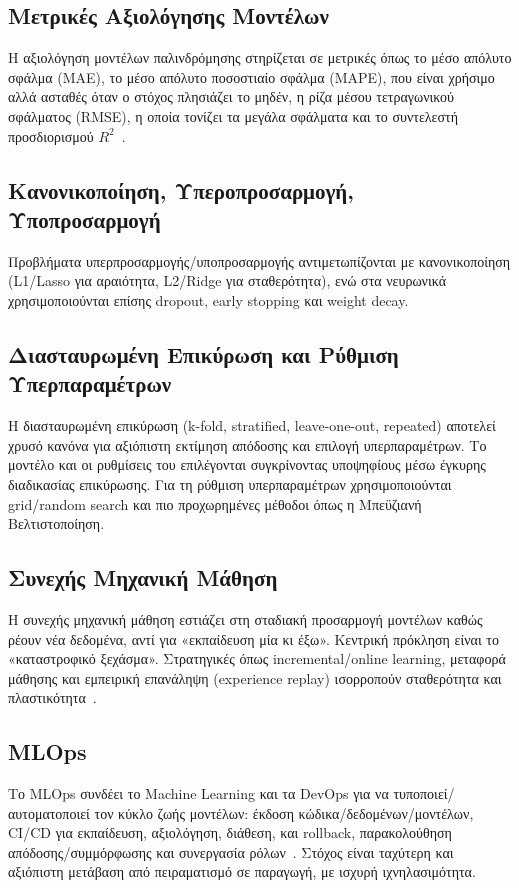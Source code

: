\subsection*{Μετρικές Αξιολόγησης Μοντέλων}
Η αξιολόγηση μοντέλων παλινδρόμησης στηρίζεται σε μετρικές όπως το μέσο απόλυτο σφάλμα (MAE), το μέσο απόλυτο ποσοστιαίο σφάλμα (MAPE), που είναι χρήσιμο αλλά ασταθές όταν ο στόχος πλησιάζει το μηδέν, η ρίζα μέσου τετραγωνικού σφάλματος (RMSE), η οποία τονίζει τα μεγάλα σφάλματα και το συντελεστή προσδιορισμού $R^2$~\cite{bishop2006pattern}.

\subsection*{Κανονικοποίηση, Υπεροπροσαρμογή, Υποπροσαρμογή}
Προβλήματα υπερπροσαρμογής/υποπροσαρμογής αντιμετωπίζονται με κανονικοποίηση (L1/Lasso για αραιότητα, L2/Ridge για σταθερότητα), ενώ στα νευρωνικά χρησιμοποιούνται επίσης dropout, early stopping και weight decay.

\subsection*{Διασταυρωμένη Επικύρωση και Ρύθμιση Υπερπαραμέτρων}
Η διασταυρωμένη επικύρωση (k-fold, stratified, leave-one-out, repeated) αποτελεί χρυσό κανόνα για αξιόπιστη εκτίμηση απόδοσης και επιλογή υπερπαραμέτρων.
Το μοντέλο και οι ρυθμίσεις του επιλέγονται συγκρίνοντας υποψηφίους μέσω έγκυρης διαδικασίας επικύρωσης.
Για τη ρύθμιση υπερπαραμέτρων χρησιμοποιούνται grid/random search και πιο προχωρημένες μέθοδοι όπως η Μπεϋζιανή Βελτιστοποίηση.

\subsection*{Συνεχής Μηχανική Μάθηση}
Η συνεχής μηχανική μάθηση εστιάζει στη σταδιακή προσαρμογή μοντέλων καθώς ρέουν νέα δεδομένα, αντί για «εκπαίδευση μία κι έξω».
Κεντρική πρόκληση είναι το «καταστροφικό ξεχάσμα».
Στρατηγικές όπως incremental/online learning, μεταφορά μάθησης και εμπειρική επανάληψη (experience replay) ισορροπούν σταθερότητα και πλαστικότητα~\cite{parisi2019continual}.

\subsection*{MLOps}
Το MLOps συνδέει το Machine Learning και τα DevOps για να τυποποιεί/αυτοματοποιεί τον κύκλο ζωής μοντέλων: έκδοση κώδικα/δεδομένων/μοντέλων, CI/CD για εκπαίδευση, αξιολόγηση, διάθεση, και rollback, παρακολούθηση απόδοσης/συμμόρφωσης και συνεργασία ρόλων~\cite{tabassam2023mlops}.
Στόχος είναι ταχύτερη και αξιόπιστη μετάβαση από πειραματισμό σε παραγωγή, με ισχυρή ιχνηλασιμότητα.

